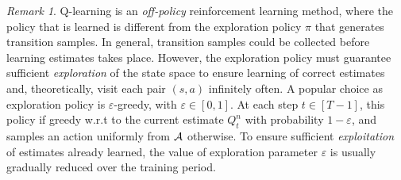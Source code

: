 \documentclass[
    a4paper,
    11pt,
    bibliography=totoc,
    listof=totoc,      
    headinclude=true,
    cleardoublepage=empty,
]{scrbook}
\theoremstyle{plain}
\theoremstyle{definition}
\theoremstyle{remark}
\newtheorem{remark}[theorem]{Remark}
\newcommand{\SpaceA}{{\cal A}}
\begin{document}
\begin{remark}
    Q-learning is an \textit{off-policy} reinforcement learning method, where 
    the policy that is learned is different from the exploration policy $\pi$
    that generates transition samples. In general, transition samples could be 
    collected before learning estimates takes place. However, the 
    exploration policy must guarantee sufficient \textit{exploration} of the 
    state space to ensure learning of correct estimates and, theoretically, 
    visit each pair $(s, a)$ infinitely often. A popular choice as exploration 
    policy is $\varepsilon$-greedy, with $\varepsilon\in[0,1]$. At each step 
    $t\in[T-1]$, this policy if greedy w.r.t to the current estimate $Q^n_t$ 
    with probability $1-\varepsilon$, and samples an action uniformly from 
    $\SpaceA$ otherwise. To ensure sufficient \textit{exploitation} of 
    estimates already learned, the value of exploration parameter 
    $\varepsilon$ is usually gradually reduced over the training period.
\end{remark}
\end{document}
